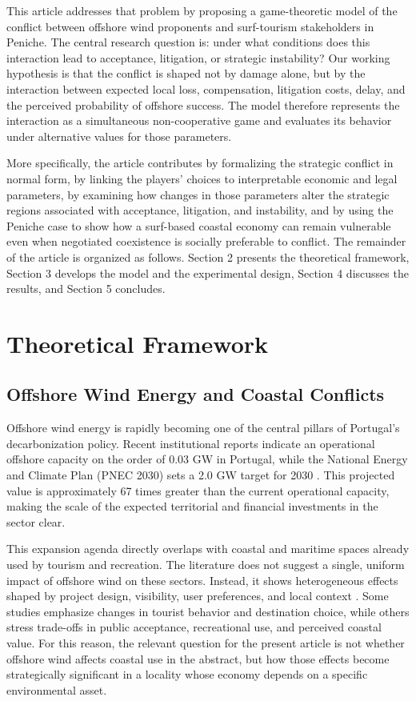 \documentclass[final,times,authoryear]{elsarticle}
\begin{document}
This article addresses that problem by proposing a game-theoretic model of the conflict between offshore wind proponents and surf-tourism stakeholders in Peniche. The central research question is: under what conditions does this interaction lead to acceptance, litigation, or strategic instability? Our working hypothesis is that the conflict is shaped not by damage alone, but by the interaction between expected local loss, compensation, litigation costs, delay, and the perceived probability of offshore success. The model therefore represents the interaction as a simultaneous non-cooperative game and evaluates its behavior under alternative values for those parameters.

More specifically, the article contributes by formalizing the strategic conflict in normal form, by linking the players' choices to interpretable economic and legal parameters, by examining how changes in those parameters alter the strategic regions associated with acceptance, litigation, and instability, and by using the Peniche case to show how a surf-based coastal economy can remain vulnerable even when negotiated coexistence is socially preferable to conflict. The remainder of the article is organized as follows. Section 2 presents the theoretical framework, Section 3 develops the model and the experimental design, Section 4 discusses the results, and Section 5 concludes.

\section{Theoretical Framework}
\subsection{Offshore Wind Energy and Coastal Conflicts}

Offshore wind energy is rapidly becoming one of the central pillars of Portugal's decarbonization policy. Recent institutional reports indicate an operational offshore capacity on the order of 0.03 GW in Portugal, while the National Energy and Climate Plan (PNEC 2030) sets a 2.0 GW target for 2030 \citep{inegi_apren2025,iea_wind_portugal_2024,portugal_draft_necp_2023}. This projected value is approximately 67 times greater than the current operational capacity, making the scale of the expected territorial and financial investments in the sector clear.

This expansion agenda directly overlaps with coastal and maritime spaces already used by tourism and recreation. The literature does not suggest a single, uniform impact of offshore wind on these sectors. Instead, it shows heterogeneous effects shaped by project design, visibility, user preferences, and local context \citep{machado_implications_2023,oh_impacts_2023,trandafir_how_2020,voltaire_public_2020,smythe_beyond_2020}. Some studies emphasize changes in tourist behavior and destination choice, while others stress trade-offs in public acceptance, recreational use, and perceived coastal value. For this reason, the relevant question for the present article is not whether offshore wind affects coastal use in the abstract, but how those effects become strategically significant in a locality whose economy depends on a specific environmental asset.
\end{document}
